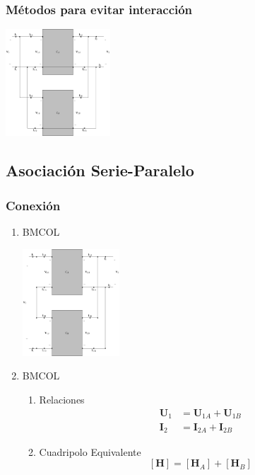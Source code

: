 \subsubsection{Métodos para evitar interacción}
\label{sec:org3abee48}

\includegraphics[height=4cm]{../figs/paralelo-paralelo-corto.pdf}

\subsection{Asociación Serie-Paralelo}
\label{sec:orgc44bd68}
\subsubsection{Conexión}
\label{sec:orgcba0d44}
\begin{enumerate}
\item \hfill{}\textsc{BMCOL}
\label{sec:orgb6b388b}

\includegraphics[height=4cm]{../figs/serie-paralelo.pdf}

\item \hfill{}\textsc{BMCOL}
\label{sec:org547d1ed}
\begin{enumerate}
\item Relaciones
\label{sec:org9cf9c76}
\begin{align*}
  \mathbf{U}_1 &= \mathbf{U}_{1A} + \mathbf{U}_{1B}\\
  \mathbf{I}_2 &= \mathbf{I}_{2A} + \mathbf{I}_{2B}
\end{align*}

\item Cuadripolo Equivalente
\label{sec:orgb751890}
\[
  \boxed{[\mathbf{H}] = [\mathbf{H}_A] + [\mathbf{H}_B]}
\]
\end{enumerate}
\end{enumerate}
